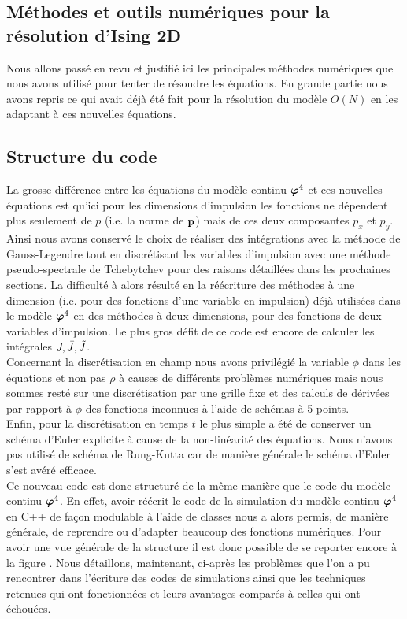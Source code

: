 \documentclass[10pt]{article}
\begin{document}
\begin{multicols}{2}
\section{Méthodes et outils numériques pour la résolution d'Ising 2D}

Nous allons passé en revu et justifié ici les principales méthodes numériques que nous avons utilisé pour tenter de résoudre les équations. En grande partie nous avons repris ce qui avait déjà été fait pour la résolution du modèle $O(N)$ en les adaptant à ces nouvelles équations.


\subsection{Structure du code}

La grosse différence entre les équations du modèle continu $\boldsymbol{ \varphi}^4$ et ces nouvelles équations est qu'ici pour les dimensions d'impulsion les fonctions ne dépendent plus seulement de $p$ (i.e. la norme de ${\bf p}$) mais de ces deux composantes $p_x$ et $p_y$. Ainsi nous avons conservé le choix de réaliser des intégrations avec la méthode de Gauss-Legendre tout en discrétisant les variables d'impulsion avec une méthode pseudo-spectrale de Tchebytchev pour des raisons détaillées dans les prochaines sections. La difficulté à alors résulté en la réécriture des méthodes à une dimension (i.e. pour des fonctions d'une variable en impulsion) déjà utilisées dans le modèle $ \boldsymbol{ \varphi}^4$ en des méthodes à deux dimensions, pour des fonctions de deux variables d'impulsion. Le plus gros défit de ce code est encore de calculer les intégrales $J, \bar{J}, \tilde{J}$. \\

Concernant la discrétisation en champ nous avons privilégié la variable $\phi$ dans les équations et non pas $\rho$ à causes de différents problèmes numériques mais nous sommes resté sur une discrétisation par une grille fixe et des calculs de dérivées par rapport à $\phi$ des fonctions inconnues à l'aide de schémas à 5 points. \\


Enfin, pour la discrétisation en temps $t$ le plus simple a été de conserver un schéma d'Euler explicite à cause de la non-linéarité des équations. Nous n'avons pas utilisé de schéma de Rung-Kutta car de manière générale le schéma d'Euler s'est avéré efficace.\\

Ce nouveau code est donc structuré de la même manière que le code du modèle continu $\boldsymbol{ \varphi}^4$. En effet, avoir réécrit le code de la simulation du modèle continu $\boldsymbol{ \varphi}^4$ en C++ de façon modulable à l'aide de classes nous a alors permis, de manière générale, de reprendre ou d'adapter beaucoup des fonctions numériques. Pour avoir une vue générale de la structure il est donc possible de se reporter encore à la figure . Nous détaillons, maintenant, ci-après les problèmes que l'on a pu rencontrer dans l'écriture des codes de simulations ainsi que les techniques retenues qui ont fonctionnées et leurs avantages comparés à celles qui ont échouées. 






\end{multicols}
\end{document}
